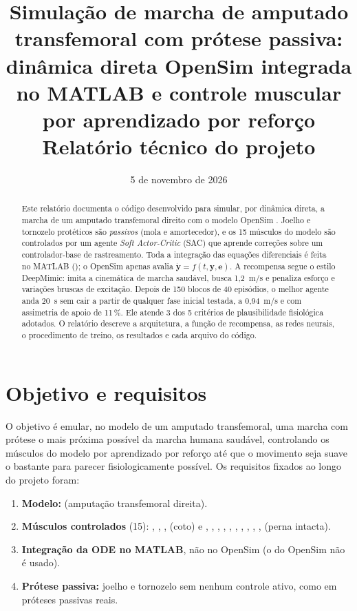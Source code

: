 \documentclass[11pt,a4paper]{article}
\title{\textbf{Simulação de marcha de amputado transfemoral com prótese passiva:\\
dinâmica direta OpenSim integrada no MATLAB e controle muscular por aprendizado por reforço}\\[4pt]
\large Relatório técnico do projeto \code{RL_OSim}}
\author{}
\date{5 de novembro de 2026}
\begin{document}
\maketitle

\begin{abstract}
Este relatório documenta o código desenvolvido para simular, por dinâmica direta, a marcha de um
amputado transfemoral direito com o modelo OpenSim .
Joelho e tornozelo protéticos são \emph{passivos} (mola e amortecedor), e os 15 músculos do modelo são
controlados por um agente \emph{Soft Actor-Critic} (SAC) que aprende correções sobre um controlador-base
de rastreamento. Toda a integração das equações diferenciais é feita no MATLAB (); o OpenSim
apenas avalia $\dot{\mathbf y}=f(t,\mathbf y,\mathbf e)$. A recompensa segue o estilo DeepMimic: imita a
cinemática de marcha saudável, busca 1{,}2~m/s e penaliza esforço e variações bruscas de excitação.
Depois de 150 blocos de 40 episódios, o melhor agente anda 20~s sem cair a partir de qualquer fase inicial
testada, a 0{,}94~m/s e com assimetria de apoio de 11\,\%. Ele atende 3 dos 5 critérios de plausibilidade
fisiológica adotados. O relatório descreve a arquitetura, a função de recompensa, as redes neurais, o
procedimento de treino, os resultados e cada arquivo do código.
\end{abstract}

\tableofcontents
\newpage

\section{Objetivo e requisitos}
O objetivo é emular, no modelo de um amputado transfemoral, uma marcha com prótese o mais próxima possível
da marcha humana saudável, controlando os músculos do modelo por aprendizado por reforço até que o
movimento seja suave o bastante para parecer fisiologicamente possível. Os requisitos fixados ao longo do
projeto foram:
\begin{enumerate}
  \item \textbf{Modelo:}  (amputação transfemoral direita).
  \item \textbf{Músculos controlados} (15): , , , 
        (coto) e , , , , ,
        , , , , ,
         (perna intacta).
  \item \textbf{Integração da ODE no MATLAB}, não no OpenSim (o  do OpenSim não é usado).
  \item \textbf{Prótese passiva:} joelho e tornozelo sem nenhum controle ativo, como em próteses passivas reais.
\end{enumerate}
\end{document}

